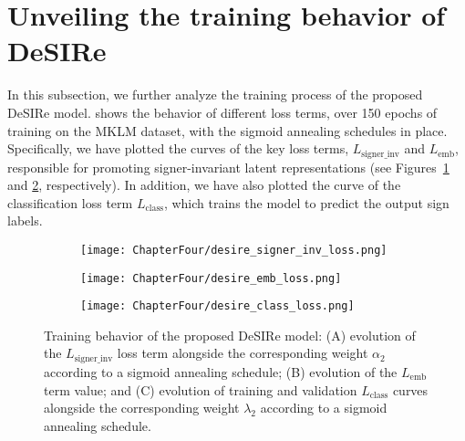 \section{Unveiling the training behavior of DeSIRe}
\label{sec:desire_training_behav}
In this subsection, we further analyze the training process of the proposed DeSIRe model.  shows the behavior of different loss terms, over 150 epochs of training on the MKLM dataset, with the sigmoid annealing schedules in place. Specifically, we have plotted the curves of the key loss terms, $L_{\text{signer\_inv}}$ and $L_{\text{emb}}$, responsible for promoting signer-invariant latent representations (see Figures~\ref{fig:signer_inv_curve} and \ref{fig:emb_loss_curve}, respectively). In addition, we have also plotted the curve of the classification loss term $L_{\text{class}}$, which trains the model to predict the output sign labels.

\begin{figure}[t]
    \centering
    \begin{subfigure}{0.325\textwidth}
        \centering
        \texttt{[image: ChapterFour/desire\_signer\_inv\_loss.png]}
        \caption{}
        \label{fig:signer_inv_curve}
    \end{subfigure}
    \hfill
    \begin{subfigure}{0.325\textwidth}
        \centering
        \texttt{[image: ChapterFour/desire\_emb\_loss.png]}
        \caption{}
        \label{fig:emb_loss_curve}
    \end{subfigure}
    \hfill
    \begin{subfigure}{0.325\textwidth}
        \centering
        \texttt{[image: ChapterFour/desire\_class\_loss.png]}
        \caption{}
        \label{fig:class_loss_curve}
    \end{subfigure}
    \caption{Training behavior of the proposed DeSIRe model: (A) evolution of the $L_{\text{signer\_inv}}$ loss term alongside the corresponding weight $\alpha_{2}$ according to a sigmoid annealing schedule; (B) evolution of the $L_{\text{emb}}$ term value; and (C) evolution of training and validation $L_{\text{class}}$ curves alongside the corresponding weight $\lambda_{2}$ according to a sigmoid annealing schedule.}
    \label{fig:desire_loss_curves}
\end{figure}

